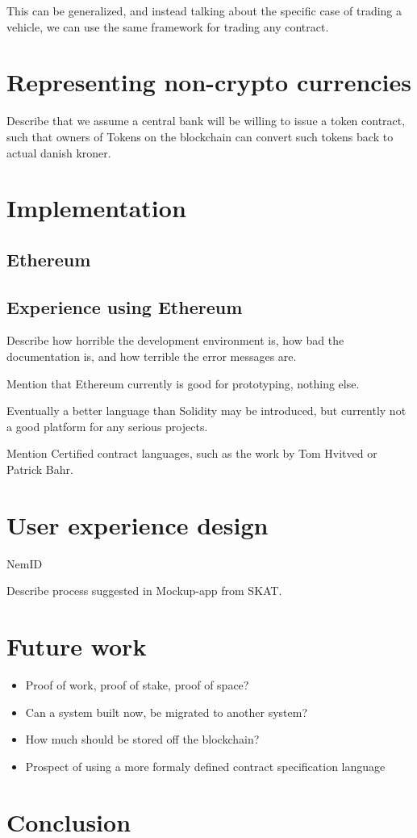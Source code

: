 \documentclass[oneside,a4paper,10pts,article]{memoir}
\begin{document}
This can be generalized, and instead talking about the specific case
of trading a vehicle, we can use the same framework for trading any
contract.


\chapter{Representing non-crypto currencies}
\label{sec:currency}
Describe that we assume a central bank will be willing to issue a
token contract, such that owners of Tokens on the blockchain can
convert such tokens back to actual danish kroner.

\chapter{Implementation}
\label{sec:implementation}

\section{Ethereum}
\cite{buterin2013ethereum, wood2014ethereum}

\section{Experience using Ethereum}
Describe how horrible the development environment is, how bad the
documentation is, and how terrible the error messages are.

Mention that Ethereum currently is good for prototyping, nothing else. 

Eventually a better language than Solidity may be introduced, but
currently not a good platform for any serious projects.

Mention Certified contract languages, such as the work by Tom Hvitved
or Patrick Bahr.

\chapter{User experience design}
NemID

Describe process suggested in Mockup-app from SKAT.

\chapter{Future work}
\label{sec:futurework}

\begin{itemize}
\item Proof of work, proof of stake, proof of space?
\item Can a system built now, be migrated to another system?
\item How much should be stored off the blockchain?
\item Prospect of using a more formaly defined contract specification language
\end{itemize}

\chapter{Conclusion}
\label{sec:conclusion}



\end{document}
